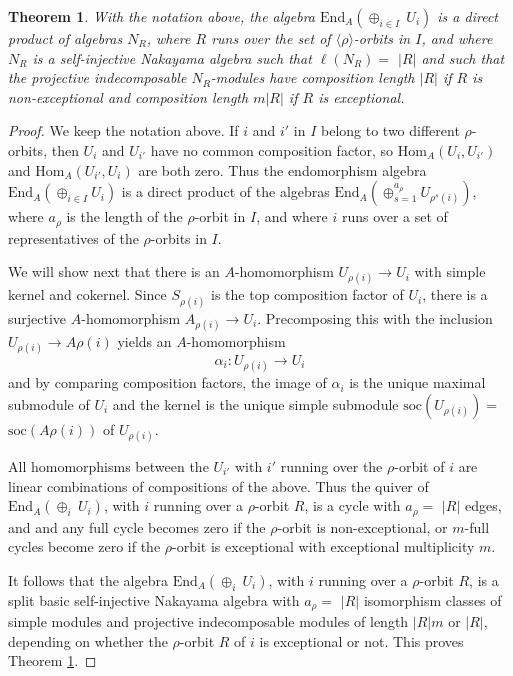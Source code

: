 \documentclass{amsart}
\theoremstyle{plain}\newtheorem{Theorem}{Theorem}[section]
\theoremstyle{plain}\newtheorem{Conjecture}[Theorem]{Conjecture}
\theoremstyle{plain}\newtheorem{Corollary}[Theorem]{Corollary}
\theoremstyle{plain}\newtheorem{Lemma}[Theorem]{Lemma}
\theoremstyle{plain}\newtheorem{Proposition}[Theorem]{Proposition}
\theoremstyle{definition}\newtheorem{Definition}[Theorem]{Definition}
\theoremstyle{definition}\newtheorem{Example}[Theorem]{Example}
\theoremstyle{definition}\newtheorem{Examples}[Theorem]{Examples}
\theoremstyle{definition}\newtheorem{Exercise}[Theorem]{Exercise}
\theoremstyle{definition}\newtheorem{Notation}[Theorem]{Notation}
\theoremstyle{definition}\newtheorem{Remark}[Theorem]{Remark}
\theoremstyle{definition}\newtheorem{Remarks}[Theorem]{Remarks}
\theoremstyle{plain}\newtheorem{Statement}[Theorem]{}
\def\End{\mathrm{End}}
\def\Hom{\mathrm{Hom}}           \def\tenkS{\otimes_{kS}}
\def\soc{\mathrm{soc}}           \def\tenOS{\otimes_{\mathcal{O}S}}
\begin{document}
\begin{Theorem} \label{Brauertree-thm-2}
With the notation above,  the algebra $\End_A(\oplus_{i\in I}\ U_i)$ is a direct 
product of algebras $N_R$, where $R$ runs over the set of
$\langle\rho\rangle$-orbits in $I$, and where $N_R$ is a self-injective Nakayama algebra
such that $\ell(N_R)=$ $|R|$ and such that the projective indecomposable
$N_R$-modules have composition length $|R|$ if $R$ is non-exceptional and
composition length $m|R|$ if $R$ is exceptional.
\end{Theorem} 


\begin{proof}
We keep the notation above. 
If $i$ and $i'$ in $I$ belong to two different $\rho$-orbits, then $U_i$ and $U_{i'}$ have 
no common composition factor, so $\Hom_A(U_i,U_{i'})$ and $\Hom_A(U_{i'}, U_i)$ are
both zero. Thus the endomorphism algebra $\End_A(\oplus_{i\in I} U_i)$ is a direct
product of the algebras $\End_A(\oplus_{s=1}^{a_\rho} U_{\rho^s(i)})$, where
$a_\rho$ is the length of the $\rho$-orbit in $I$, and where $i$ runs over a set
of representatives of the $\rho$-orbits in $I$.

We will show next that there is an $A$-homomorphism $U_{\rho(i)}\to U_i$
with simple kernel and cokernel.
Since $S_{\rho(i)}$ is the top composition factor of $U_i$, there is a surjective
$A$-homomorphism $A_{\rho(i)}\to U_i$. Precomposing this with the
inclusion $U_{\rho(i)}\to A\rho(i)$ yields an $A$-homomorphism
$$\alpha_i : U_{\rho(i)} \to U_i$$
and by comparing composition factors, the image of $\alpha_i$ is the unique
maximal submodule of $U_i$ and the kernel is the unique simple submodule
$\soc(U_{\rho(i)})=$ $\soc(A\rho(i))$ of $U_{\rho(i)}$.

All homomorphisms between the $U_{i'}$ with $i'$ running over the 
$\rho$-orbit of $i$ are linear combinations of compositions of the above.
Thus the quiver of $\End_A(\oplus_{i}\ U_i)$, with $i$ running over a $\rho$-orbit
$R$, is a cycle with $a_\rho=$ $|R|$ edges, and and any full cycle becomes zero if the
$\rho$-orbit is non-exceptional, or $m$-full cycles become zero if the $\rho$-orbit
is exceptional with exceptional multiplicity $m$.
 
It follows that the algebra $\End_A(\oplus_{i}\ U_i)$, with $i$ running over a
$\rho$-orbit $R$, is a split basic  self-injective Nakayama algebra with $a_\rho=$
$|R|$  isomorphism 
classes of simple modules and projective indecomposable modules of 
length $|R| m$ or $|R| $, depending on whether the $\rho$-orbit $R$ of $i$
is exceptional or not.
This proves Theorem \ref{Brauertree-thm-2}.
\end{proof}
\end{document}
